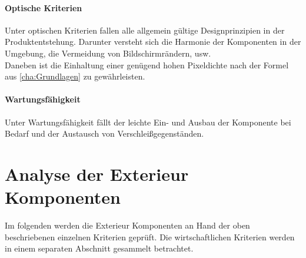 \paragraph{Optische Kriterien}
Unter optischen Kriterien fallen alle allgemein gültige Designprinzipien in der Produktentstehung. Darunter versteht sich die Harmonie der Komponenten in der Umgebung, die Vermeidung von Bildschirmrändern, usw. \\
Daneben ist die Einhaltung einer genügend hohen Pixeldichte nach der Formel aus \ref{cha:Grundlagen} zu gewährleisten.
\paragraph{Wartungsfähigkeit}
Unter Wartungsfähigkeit fällt der leichte Ein- und Ausbau der Komponente bei Bedarf und der Austausch von Verschleißgegenständen.
\section{Analyse der Exterieur Komponenten}
Im folgenden werden die Exterieur Komponenten an Hand der oben beschriebenen einzelnen Kriterien geprüft. Die wirtschaftlichen Kriterien werden in einem separaten Abschnitt gesammelt betrachtet. 
